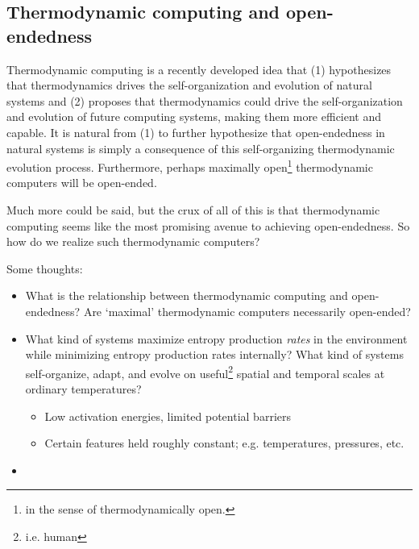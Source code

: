 \documentclass[12pt,letterpaper]{article}
\begin{document}


\subsection{Thermodynamic computing and open-endedness}

Thermodynamic computing is a recently developed idea that (1) hypothesizes that thermodynamics drives the self-organization and evolution of natural systems and (2) proposes that thermodynamics could drive the self-organization and evolution of future computing systems, making them more efficient and capable. It is natural from (1) to further hypothesize that open-endedness in natural systems is simply a consequence of this self-organizing thermodynamic evolution process. Furthermore, perhaps maximally open\footnote{in the sense of thermodynamically open.} thermodynamic computers will be open-ended.

Much more could be said, but the crux of all of this is that thermodynamic computing seems like the most promising avenue to achieving open-endedness. So how do we realize such thermodynamic computers?


Some thoughts:
\begin{itemize}
\item What is the relationship between thermodynamic computing and open-endedness? Are `maximal' thermodynamic computers necessarily open-ended?
\item What kind of systems maximize entropy production {\em rates} in the environment while minimizing entropy production rates internally? What kind of systems self-organize, adapt, and evolve on useful\footnote{i.e. human} spatial and temporal scales at ordinary temperatures?
\begin{itemize}
    \item Low activation energies, limited potential
    barriers
    \item Certain features held roughly constant; e.g. temperatures, pressures, etc.
\end{itemize}
\item
\end{itemize}
\end{document}
